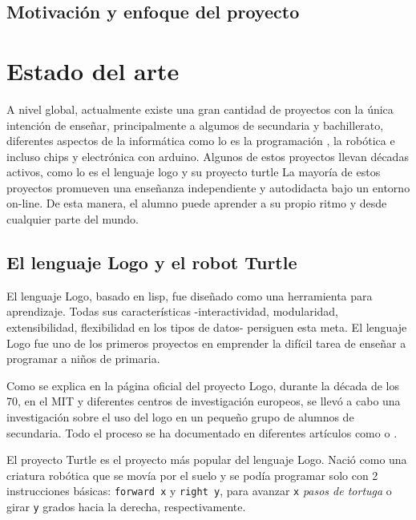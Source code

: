 \section{Motivación y enfoque del proyecto}
\label{sec:motivacion}


\chapter{Estado del arte}\label{estado-arte}



A nivel global, actualmente existe una gran cantidad de proyectos con la única intención de enseñar, principalmente a algumos de secundaria y bachillerato, diferentes aspectos de la informática como lo es la programación \cite{code-school,code-org,code-academy}, la robótica \cite{robomind-web,moway} e incluso chips y electrónica con \Gls{arduino}\cite{arduino}. Algunos de estos proyectos llevan décadas activos, como lo es el lenguaje \Gls{logo}\cite{logo} y su proyecto \Gls{turtle}\cite{logo-turtle}
La mayoría de estos proyectos promueven una enseñanza independiente y autodidacta bajo un entorno on-line. De esta manera, el alumno puede aprender a su propio ritmo y desde cualquier parte del mundo.


\section{El lenguaje Logo y el robot Turtle}
\label{sec:Logo}

El lenguaje Logo, basado en \Gls{lisp}, fue diseñado como una herramienta para aprendizaje. Todas sus características -interactividad, modularidad, extensibilidad, flexibilidad en los tipos de datos- persiguen esta meta. El lenguaje Logo fue uno de los primeros proyectos en emprender la difícil tarea de enseñar a programar a niños de primaria.

Como se explica en la página oficial del proyecto Logo\cite{logo}, durante la década de los 70, en el \acrfull{MIT} y diferentes centros de investigación europeos, se llevó a cabo una investigación sobre el uso del \Gls{logo} en un pequeño grupo de alumnos de secundaria. Todo el proceso se ha documentado en diferentes artículos como \cite{feurzeig1969programming} o \cite{pea1984logo}.

El proyecto Turtle es el proyecto más popular del lenguaje Logo. Nació como una criatura robótica que se movía por el suelo y se podía programar solo con 2 instrucciones básicas: \texttt{forward x} y \texttt{right y}, para avanzar \texttt{x} \emph{pasos de tortuga} o girar \texttt{y} grados hacia la derecha, respectivamente.

